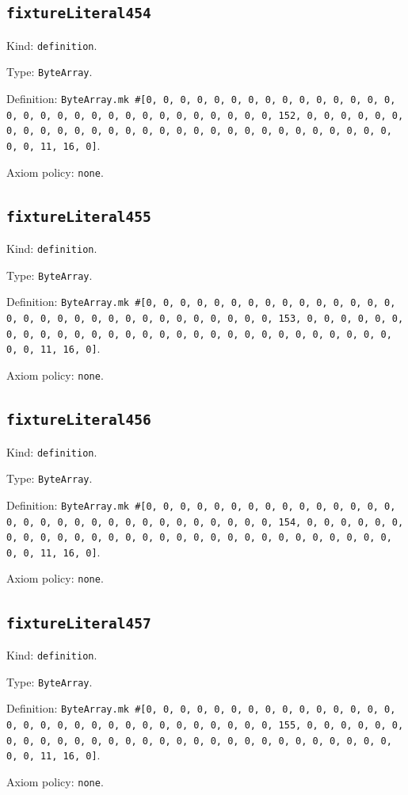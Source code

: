 \documentclass[11pt]{article}
\begin{document}
\subsection*{\texttt{fixtureLiteral454}}
\noindent Kind: \texttt{definition}.\par
\noindent Type: \texttt{ByteArray}.\par
\noindent Definition: \texttt{ByteArray.mk \#[0, 0, 0, 0, 0, 0, 0, 0, 0, 0, 0, 0, 0, 0, 0, 0, 0, 0, 0, 0, 0, 0, 0, 0, 0, 0, 0, 0, 0, 0, 0, 152, 0, 0, 0, 0, 0, 0, 0, 0, 0, 0, 0, 0, 0, 0, 0, 0, 0, 0, 0, 0, 0, 0, 0, 0, 0, 0, 0, 0, 0, 0, 0, 11, 16, 0]}.\par
\noindent Axiom policy: \texttt{none}.\par
\subsection*{\texttt{fixtureLiteral455}}
\noindent Kind: \texttt{definition}.\par
\noindent Type: \texttt{ByteArray}.\par
\noindent Definition: \texttt{ByteArray.mk \#[0, 0, 0, 0, 0, 0, 0, 0, 0, 0, 0, 0, 0, 0, 0, 0, 0, 0, 0, 0, 0, 0, 0, 0, 0, 0, 0, 0, 0, 0, 0, 153, 0, 0, 0, 0, 0, 0, 0, 0, 0, 0, 0, 0, 0, 0, 0, 0, 0, 0, 0, 0, 0, 0, 0, 0, 0, 0, 0, 0, 0, 0, 0, 11, 16, 0]}.\par
\noindent Axiom policy: \texttt{none}.\par
\subsection*{\texttt{fixtureLiteral456}}
\noindent Kind: \texttt{definition}.\par
\noindent Type: \texttt{ByteArray}.\par
\noindent Definition: \texttt{ByteArray.mk \#[0, 0, 0, 0, 0, 0, 0, 0, 0, 0, 0, 0, 0, 0, 0, 0, 0, 0, 0, 0, 0, 0, 0, 0, 0, 0, 0, 0, 0, 0, 0, 154, 0, 0, 0, 0, 0, 0, 0, 0, 0, 0, 0, 0, 0, 0, 0, 0, 0, 0, 0, 0, 0, 0, 0, 0, 0, 0, 0, 0, 0, 0, 0, 11, 16, 0]}.\par
\noindent Axiom policy: \texttt{none}.\par
\subsection*{\texttt{fixtureLiteral457}}
\noindent Kind: \texttt{definition}.\par
\noindent Type: \texttt{ByteArray}.\par
\noindent Definition: \texttt{ByteArray.mk \#[0, 0, 0, 0, 0, 0, 0, 0, 0, 0, 0, 0, 0, 0, 0, 0, 0, 0, 0, 0, 0, 0, 0, 0, 0, 0, 0, 0, 0, 0, 0, 155, 0, 0, 0, 0, 0, 0, 0, 0, 0, 0, 0, 0, 0, 0, 0, 0, 0, 0, 0, 0, 0, 0, 0, 0, 0, 0, 0, 0, 0, 0, 0, 11, 16, 0]}.\par
\noindent Axiom policy: \texttt{none}.\par
\end{document}
